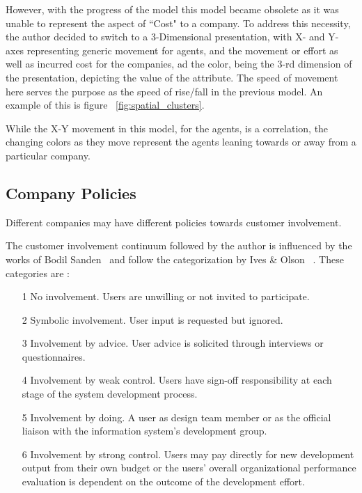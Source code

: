 However, with the progress of the model this model became obsolete as it was unable to represent the aspect of ``Cost" to a company. 
To address this necessity, the author decided to switch to a 3-Dimensional presentation, with X- and Y- axes representing generic movement for agents, and the movement or effort as well as incurred cost for the companies, ad the color, being the 3-rd dimension of the presentation, depicting the value of the attribute. The speed of movement here serves the purpose as the speed of rise/fall in the previous model. An example of this is figure ~\ref{fig:spatial_clusters}.

While the X-Y movement in this model, for the agents, is a correlation, the changing colors as they move represent the agents leaning towards or away from a particular company.

\subsection{Company Policies}
\label{sec:policies}
Different companies may have different policies towards customer involvement. 

The customer involvement continuum followed by the author is influenced by the works of Bodil Sanden~\cite{bodil} and follow the categorization by Ives \& Olson ~\cite{1984}.
These categories are :

\begin{enumerate}

\item[1] No involvement. Users are unwilling or not invited to participate.
\item[2] Symbolic involvement. User input is requested but ignored. 
\item[3] Involvement by advice. User advice is solicited through interviews
or questionnaires.
\item[4]  Involvement by weak control. Users have sign-off responsibility at
each stage of the system development process. 
\item[5] Involvement by doing. A user as design team member or as the
official liaison with the information system’s development group. 
\item[6] Involvement by strong control. Users may pay directly for new
development output from their own budget or the users’ overall
organizational performance evaluation is dependent on the
outcome of the development effort. 
\end{enumerate}


